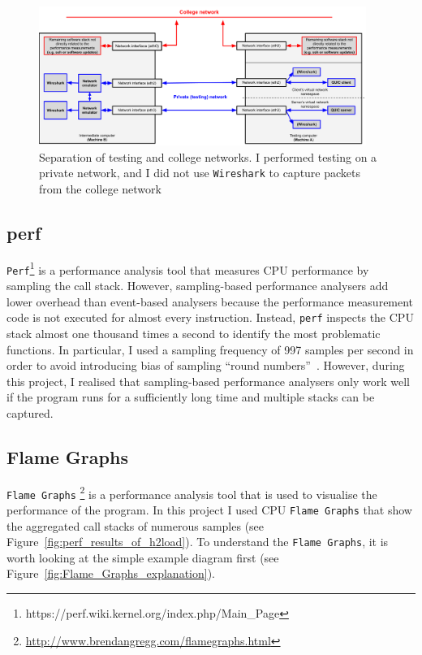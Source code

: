 \documentclass[12pt,a4paper,twoside,openright]{report}
\begin{document}
    \begin{figure}[H]
    \centering
    \includegraphics[width=0.95\textwidth]{figs/Wireshark_separation.png}
    \caption[Separation of testing and college networks]{Separation of testing and college networks. I performed testing on a private network, and I did not use \texttt{Wireshark} to capture packets from the college network}
    \label{fig:Wireshark_separation}
    \end{figure}



\subsection{perf}
\texttt{Perf}\footnote{https://perf.wiki.kernel.org/index.php/Main\_Page} is a performance analysis tool that measures CPU performance by sampling the call stack.
However, sampling-based performance analysers add lower overhead than event-based analysers because the performance measurement code is not executed for almost every instruction.
Instead, \texttt{perf} inspects the CPU stack almost one thousand times a second to identify the most problematic functions.
In particular, I used a sampling frequency of 997 samples per second in order to avoid introducing bias of sampling \enquote{round numbers}~\cite{perf-cpu-sample}.
However, during this project, I realised that sampling-based performance analysers only work well if the program runs for a sufficiently long time and multiple stacks can be captured.



\subsection{Flame Graphs}
\texttt{Flame Graphs} \footnote{\url{http://www.brendangregg.com/flamegraphs.html}} is a performance analysis tool that is used to visualise the performance of the program.
In this project I used CPU \texttt{Flame Graphs} that show the aggregated call stacks of numerous samples (see Figure~\ref{fig:perf_results_of_h2load}).
To understand the \texttt{Flame Graphs}, it is worth looking at the simple example diagram first (see Figure~\ref{fig:Flame_Graphs_explanation}).
\end{document}
